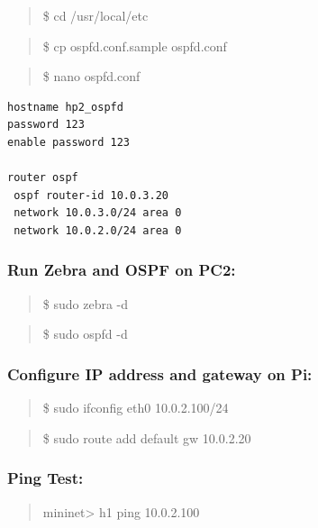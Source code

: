 \begin{quote}
\$ cd /usr/local/etc
\end{quote}

\begin{quote}
\$ cp ospfd.conf.sample ospfd.conf
\end{quote}

\begin{quote}
\$ nano ospfd.conf
\end{quote}

\begin{adjustwidth}{1cm}{0cm}
\begin{verbatim}
hostname hp2_ospfd
password 123
enable password 123

router ospf
 ospf router-id 10.0.3.20
 network 10.0.3.0/24 area 0
 network 10.0.2.0/24 area 0
\end{verbatim}
 \end{adjustwidth}

\subsubsection{Run Zebra and OSPF on PC2:}\label{run-zebra-and-ospf-on-pc2}

\begin{quote}
\$ sudo zebra -d
\end{quote}

\begin{quote}
\$ sudo ospfd -d
\end{quote}

\subsubsection{Configure IP address and gateway on
Pi:}\label{configure-ip-address-and-gateway-on-pi}

\begin{quote}
\$ sudo ifconfig eth0 10.0.2.100/24
\end{quote}

\begin{quote}
\$ sudo route add default gw 10.0.2.20
\end{quote}

\subsubsection{Ping Test:}\label{ping-test-1}

\begin{quote}
mininet\textgreater{} h1 ping 10.0.2.100
\end{quote}

